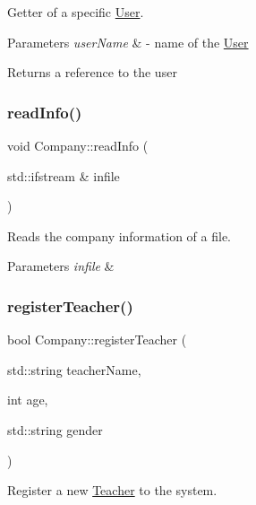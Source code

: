 Getter of a specific \mbox{\hyperlink{class_user}{User}}. 


\begin{DoxyParams}{Parameters}
{\em user\+Name} & -\/ name of the \mbox{\hyperlink{class_user}{User}} \\
\hline
\end{DoxyParams}
\begin{DoxyReturn}{Returns}
a reference to the user 
\end{DoxyReturn}
\mbox{\label{class_company_a2b97cd4ed80ecab0aa92d0f9c1f81071}} 
\subsubsection{\texorpdfstring{read\+Info()}{readInfo()}}
{\footnotesize\ttfamily void Company\+::read\+Info (\begin{DoxyParamCaption}\item[{std\+::ifstream \&}]{infile }\end{DoxyParamCaption})}



Reads the company information of a file. 


\begin{DoxyParams}{Parameters}
{\em infile} & \\
\hline
\end{DoxyParams}
\mbox{\label{class_company_afd7f0c326672c6bb6a23d5921503bc0d}} 
\subsubsection{\texorpdfstring{register\+Teacher()}{registerTeacher()}}
{\footnotesize\ttfamily bool Company\+::register\+Teacher (\begin{DoxyParamCaption}\item[{std\+::string}]{teacher\+Name,  }\item[{int}]{age,  }\item[{std\+::string}]{gender }\end{DoxyParamCaption})}




\begin{DoxyItemize}
\item Register a new \mbox{\hyperlink{class_teacher}{Teacher}} to the system. 
\end{DoxyItemize}


